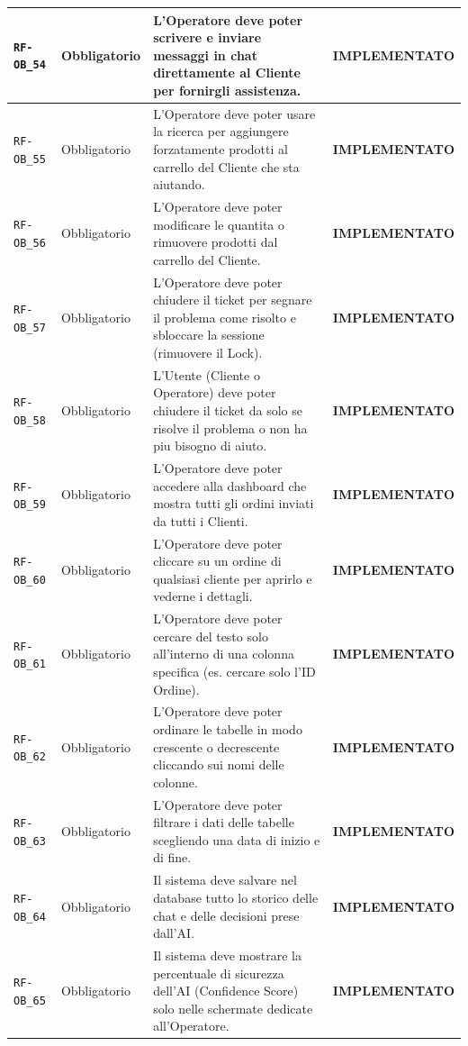 \documentclass[a4paper, 11pt, oneside]{scrartcl}
\begin{document}
\begin{longtable}{|>{\raggedright\arraybackslash}p{}|>{\raggedright\arraybackslash}p{}|>{\raggedright\arraybackslash}p{}|>{\raggedright\arraybackslash}p{}|}
    \hline
    \texttt{RF-OB\_54} & Obbligatorio & L'Operatore deve poter scrivere e inviare messaggi in chat direttamente al Cliente per fornirgli assistenza. & \textbf{IMPLEMENTATO} \\
    \hline
    \texttt{RF-OB\_55} & Obbligatorio & L'Operatore deve poter usare la ricerca per aggiungere forzatamente prodotti al carrello del Cliente che sta aiutando. & \textbf{IMPLEMENTATO} \\
    \hline
    \texttt{RF-OB\_56} & Obbligatorio & L'Operatore deve poter modificare le quantita o rimuovere prodotti dal carrello del Cliente. & \textbf{IMPLEMENTATO} \\
    \hline
    \texttt{RF-OB\_57} & Obbligatorio & L'Operatore deve poter chiudere il ticket per segnare il problema come risolto e sbloccare la sessione (rimuovere il Lock). & \textbf{IMPLEMENTATO} \\
    \hline
    \texttt{RF-OB\_58} & Obbligatorio & L'Utente (Cliente o Operatore) deve poter chiudere il ticket da solo se risolve il problema o non ha piu bisogno di aiuto. & \textbf{IMPLEMENTATO} \\
    \hline
    \texttt{RF-OB\_59} & Obbligatorio & L'Operatore deve poter accedere alla dashboard che mostra tutti gli ordini inviati da tutti i Clienti. & \textbf{IMPLEMENTATO} \\
    \hline
    \texttt{RF-OB\_60} & Obbligatorio & L'Operatore deve poter cliccare su un ordine di qualsiasi cliente per aprirlo e vederne i dettagli. & \textbf{IMPLEMENTATO} \\
    \hline
    \texttt{RF-OB\_61} & Obbligatorio & L'Operatore deve poter cercare del testo solo all'interno di una colonna specifica (es. cercare solo l'ID Ordine). & \textbf{IMPLEMENTATO} \\
    \hline
    \texttt{RF-OB\_62} & Obbligatorio & L'Operatore deve poter ordinare le tabelle in modo crescente o decrescente cliccando sui nomi delle colonne. & \textbf{IMPLEMENTATO} \\
    \hline
    \texttt{RF-OB\_63} & Obbligatorio & L'Operatore deve poter filtrare i dati delle tabelle scegliendo una data di inizio e di fine. & \textbf{IMPLEMENTATO} \\
    \hline
    \texttt{RF-OB\_64} & Obbligatorio & Il sistema deve salvare nel database tutto lo storico delle chat e delle decisioni prese dall'AI. & \textbf{IMPLEMENTATO} \\
    \hline
    \texttt{RF-OB\_65} & Obbligatorio & Il sistema deve mostrare la percentuale di sicurezza dell'AI (Confidence Score) solo nelle schermate dedicate all'Operatore. & \textbf{IMPLEMENTATO} \\

\end{longtable}
\end{document}
